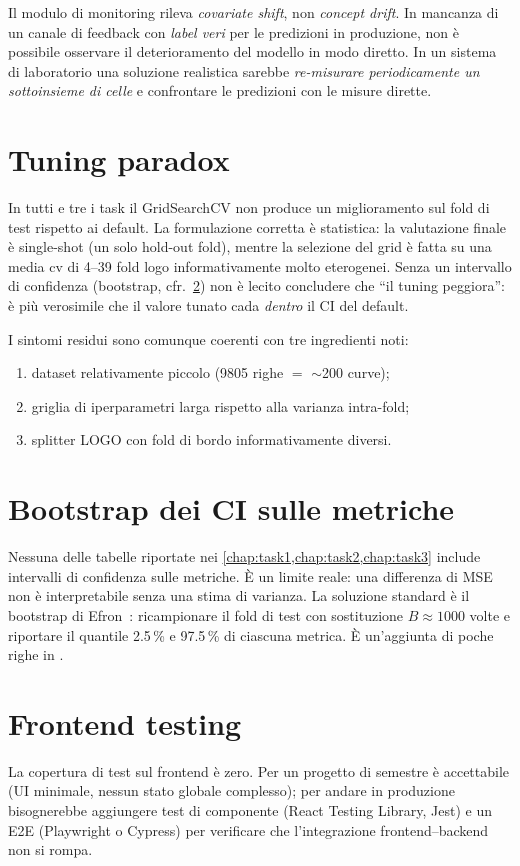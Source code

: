 Il modulo di monitoring rileva \emph{covariate shift}, non
\emph{concept drift}. In mancanza di un canale di feedback con
\emph{label veri} per le predizioni in produzione, non è possibile
osservare il deterioramento del modello in modo diretto. In un sistema
di laboratorio una soluzione realistica sarebbe \emph{re-misurare
periodicamente un sottoinsieme di celle} e confrontare le predizioni
con le misure dirette.

\section{Tuning paradox}

In tutti e tre i task il GridSearchCV non produce un miglioramento sul
fold di test rispetto ai default. La formulazione corretta è
statistica: la valutazione finale è single-shot (un solo hold-out
fold), mentre la selezione del grid è fatta su una media \acrshort{cv}
di 4--39 fold \acrshort{logo} informativamente molto eterogenei. Senza
un intervallo di confidenza (bootstrap, cfr.~\cref{sec:bootstrap}) non
è lecito concludere che ``il tuning peggiora'': è più verosimile che il
valore tunato cada \emph{dentro} il CI del default.

I sintomi residui sono comunque coerenti con tre ingredienti noti:
\begin{enumerate}[leftmargin=*]
  \item dataset relativamente piccolo (\num{9805} righe $=$ $\sim$200
        curve);
  \item griglia di iperparametri larga rispetto alla varianza
        intra-fold;
  \item splitter LOGO con fold di bordo informativamente diversi.
\end{enumerate}

\section{Bootstrap dei CI sulle metriche}
\label{sec:bootstrap}

Nessuna delle tabelle riportate nei \cref{chap:task1,chap:task2,chap:task3}
include intervalli di confidenza sulle metriche. È un limite reale: una
differenza di MSE non è interpretabile senza una stima di varianza. La
soluzione standard è il bootstrap di Efron~\cite{efron1979bootstrap}:
ricampionare il fold di test con sostituzione $B \approx 1000$ volte e
riportare il quantile 2.5\,\% e 97.5\,\% di ciascuna metrica. È
un'aggiunta di poche righe in .

\section{Frontend testing}

La copertura di test sul frontend è zero. Per un progetto di semestre
è accettabile (UI minimale, nessun stato globale complesso); per andare
in produzione bisognerebbe aggiungere test di componente
(React Testing Library, Jest) e un E2E (Playwright o Cypress) per
verificare che l'integrazione frontend--backend non si rompa.
